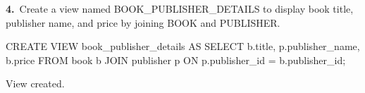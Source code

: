\noindent\begin{minipage}{\linewidth}
\begingroup{}
{\fontsize{14}{17}\selectfont\textbf{4.}}\ Create a view named BOOK\_PUBLISHER\_DETAILS to display book title, publisher name, and price by joining BOOK and PUBLISHER.\par
\endgroup\vspace{12pt}


\begin{sqlcode}
CREATE VIEW book_publisher_details AS
SELECT b.title, p.publisher_name, b.price
FROM book b
JOIN publisher p ON p.publisher_id = b.publisher_id;
\end{sqlcode}

\vspace{18pt}


\begin{sqlout}[fontsize=\small]
View created.
\end{sqlout}
\end{minipage}\par\vspace{24pt}

